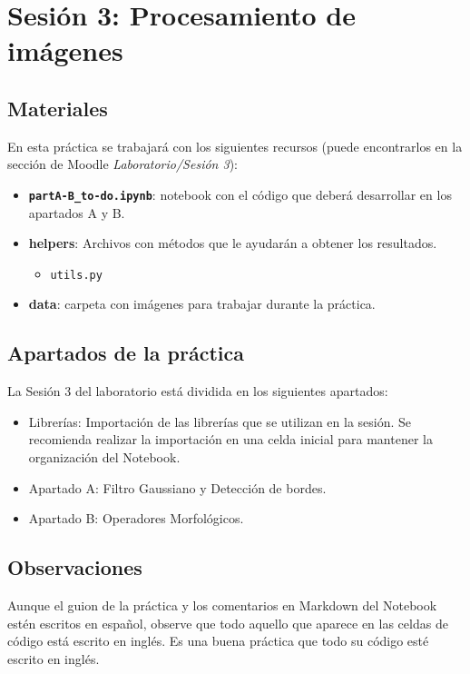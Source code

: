 \chapter{Sesión 3: Procesamiento de imágenes}
\label{chapter:introduction_ses_3}

\section{Materiales}

En esta práctica se trabajará con los siguientes recursos (puede encontrarlos en la sección de Moodle \textit{Laboratorio/Sesión 3}):

\begin{itemize}
    \item \textbf{\texttt{partA-B\_to-do.ipynb}}: notebook con el código que deberá desarrollar en los apartados A y B.
    \item \textbf{helpers}: Archivos con métodos que le ayudarán a obtener los resultados. 
    \begin{itemize}
        \item \texttt{utils.py}
    \end{itemize}
    \item \textbf{data}: carpeta con imágenes para trabajar durante la práctica.
\end{itemize}

\section{Apartados de la práctica}

La Sesión 3 del laboratorio está dividida en los siguientes apartados:

\begin{itemize}
    \item Librerías: Importación de las librerías que se utilizan en la sesión. Se recomienda realizar la importación en una celda inicial para mantener la organización del Notebook.
    \item Apartado A: Filtro Gaussiano y Detección de bordes.
    \item Apartado B: Operadores Morfológicos.
\end{itemize}

\section{Observaciones}

Aunque el guion de la práctica y los comentarios en Markdown del Notebook estén escritos en español, observe que todo aquello que aparece en las celdas de código está escrito en inglés. Es una buena práctica que todo su código esté escrito en inglés.

